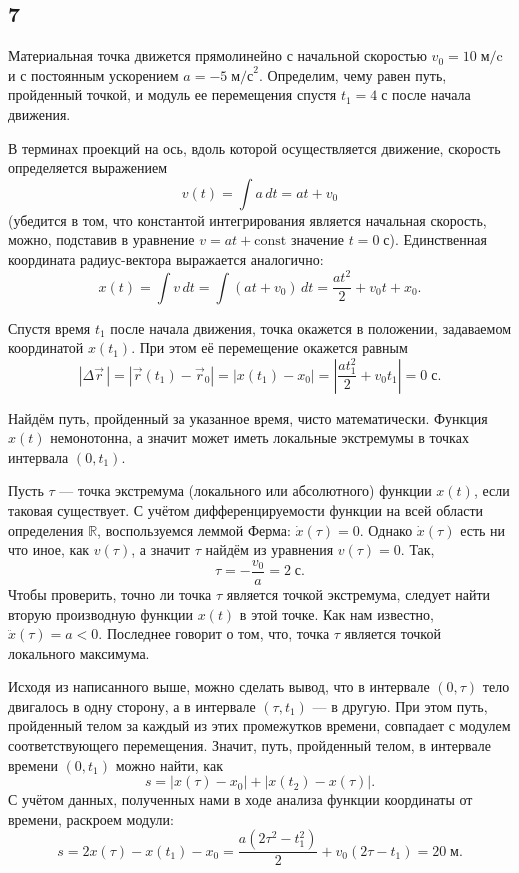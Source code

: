 \subsection{7}

Материальная точка движется прямолинейно с начальной скоростью $v_0=10\;\text{м/c}$ и с постоянным ускорением $a=-5\;\text{м/с}^2$. Определим, чему равен путь, пройденный точкой, и модуль ее перемещения спустя $t_1=4\;\text{с}$ после начала движения.

В терминах проекций на ось, вдоль которой осуществляется движение, скорость определяется выражением
\[
v(t)=\int a\,dt=at+v_0
\]
(убедится в том, что константой интегрирования является начальная скорость, можно, подставив в уравнение $v=at+\text{const}$ значение $t=0\;\text{с}$). Единственная координата радиус-вектора выражается аналогично:
\[
x(t)=\int v\,dt=\int(at+v_0)\,dt=\frac{at^2}{2}+v_0t+x_0.
\]

Спустя время $t_1$ после начала движения, точка окажется в положении, задаваемом координатой $x(t_1)$. При этом её перемещение окажется равным
\[
\left|\Delta\vec r\,\right|=\left|\vec r(t_1)-\vec r_0\right|=|x(t_1)-x_0|=\left|\frac{at_1^2}{2}+v_0t_1\right|=0\;\text{с}.
\]

Найдём путь, пройденный за указанное время, чисто математически. Функция $x(t)$ немонотонна, а значит может иметь локальные экстремумы в точках интервала $(0, t_1)$.

Пусть $\tau$ --- точка экстремума (локального или абсолютного) функции $x(t)$, если таковая существует. С учётом дифференцируемости функции на всей области определения $\mathbb R$, воспользуемся леммой Ферма: $\dot x(\tau)=0$. Однако $\dot x(\tau)$ есть ни что иное, как $v(\tau)$, а значит $\tau$ найдём из уравнения $v(\tau)=0$. Так,
\[
\tau=-\frac{v_0}{a}=2\;\text{с}.
\]
Чтобы проверить, точно ли точка $\tau$ является точкой экстремума, следует найти вторую производную функции $x(t)$ в этой точке. Как нам известно, $\ddot x(\tau)=a<0$. Последнее говорит о том, что, точка $\tau$ является точкой локального максимума.

Исходя из написанного выше, можно сделать вывод, что в интервале $(0,\tau)$ тело двигалось в одну сторону, а в интервале $(\tau, t_1)$ --- в другую. При этом путь, пройденный телом за каждый из этих промежутков времени, совпадает с модулем соответствующего перемещения. Значит, путь, пройденный телом, в интервале времени $(0, t_1)$ можно найти, как
\[
s=|x(\tau)-x_0|+|x(t_2)-x(\tau)|.
\]
С учётом данных, полученных нами в ходе анализа функции координаты от времени, раскроем модули:
\[
s=2x(\tau)-x(t_1)-x_0=\frac{a(2\tau^2-t_1^2)}{2}+v_0(2\tau-t_1)=20\;\text{м}.
\]